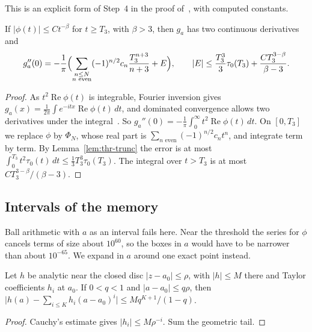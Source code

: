 This is an explicit form of Step~4 in the proof of~\cite[Theorem~2.5]{glr2026},
with computed constants.

\begin{lemma}\label{lem:thr-fpp}
If $\lvert\phi(t)\rvert\le Ct^{-\beta}$ for $t\ge T_3$, with $\beta>3$, then
$g_a$ has two continuous derivatives and
\[
 g_a''(0)=-\frac1\pi\Bigl(\sum_{\substack{n\le N\\ n\text{ even}}}
 (-1)^{n/2}c_n\frac{T_3^{n+3}}{n+3}+E\Bigr),\qquad
 \lvert E\rvert\le\frac{T_3^3}3\tau_0(T_3)+\frac{CT_3^{3-\beta}}{\beta-3} .
\]
\end{lemma}

\begin{proof}
As $t^2\operatorname{Re}\phi(t)$ is integrable, Fourier inversion gives
$g_a(x)=\frac1{2\pi}\int e^{-itx}\operatorname{Re}\phi(t)\,dt$, and dominated
convergence allows two derivatives under the
integral~\cite[Section~3.3]{durrett2019}. So
$g_a''(0)=-\frac1\pi\int_0^\infty t^2\operatorname{Re}\phi(t)\,dt$. On
$[0,T_3]$ we replace $\phi$ by $\Phi_N$, whose real part is
$\sum_{n\text{ even}}(-1)^{n/2}c_nt^n$, and integrate term by term. By
Lemma~\ref{lem:thr-trunc} the error is at most
$\int_0^{T_3}t^2\tau_0(t)\,dt\le\frac13T_3^3\tau_0(T_3)$. The integral over
$t>T_3$ is at most $CT_3^{3-\beta}/(\beta-3)$.
\end{proof}

\subsection{Intervals of the memory}

Ball arithmetic with $a$ as an interval fails here. Near the threshold the
series for $\phi$ cancels terms of size about $10^{60}$, so the boxes in $a$
would have to be narrower than about $10^{-65}$. We expand in $a$ around one
exact point instead.

\begin{lemma}\label{lem:thr-taylor}
Let $h$ be analytic near the closed disc $\lvert z-a_0\rvert\le\rho$, with
$\lvert h\rvert\le M$ there and Taylor coefficients $h_i$ at $a_0$. If $0<q<1$
and $\lvert a-a_0\rvert\le q\rho$, then
$\lvert h(a)-\sum_{i\le K}h_i(a-a_0)^i\rvert\le Mq^{K+1}/(1-q)$.
\end{lemma}

\begin{proof}
Cauchy's estimate gives $\lvert h_i\rvert\le M\rho^{-i}$. Sum the geometric
tail.
\end{proof}

